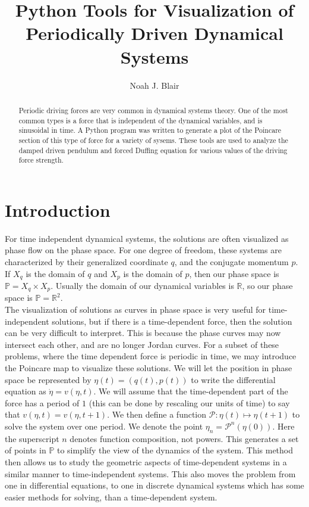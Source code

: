 \documentclass{paper}
\author{Noah J. Blair}
\title{Python Tools for Visualization of  Periodically Driven Dynamical Systems}
\newcommand{\bb}[1]{\mathbb{#1}}
\newcommand{\mc}[1]{\mathcal{#1}}
\begin{document}
\maketitle
\begin{abstract}
Periodic driving forces are very common in dynamical systems theory. One of the most common types is a force that is independent of the dynamical variables, and is sinusoidal in time. A Python program was written to generate a plot of the Poincare section of this type of force for a variety of sysems. These tools are used to analyze the damped driven pendulum and forced Duffing equation for various values of the driving force strength.
\end{abstract}
\section{Introduction}
For time independent dynamical systems, the solutions are often visualized as phase flow on the phase space. For one degree of freedom, these systems are characterized by their generalized coordinate $q$, and the conjugate momentum $p$. If $X_q$ is the domain of $q$ and $X_p$ is the domain of $p$, then our phase space is $\bb{P}=X_q\times X_p$. Usually the domain of our dynamical variables is $\bb{R}$, so our phase space is $\bb{P}=\bb{R}^2$.\\
The visualization of solutions as curves in phase space is very useful for time-independent solutions, but if there is a time-dependent force, then the solution can be very difficult to interpret. This is because the phase curves may now intersect each other, and are no longer Jordan curves. For a subset of these problems, where the time dependent force is periodic in time, we may introduce the Poincare map to visualize these solutions. We will let the position in phase space be represented by $\eta(t)=(q(t),p(t))$ to write the differential equation as $\dot{\eta}=v(\eta,t)$. We will assume that the time-dependent part of the force has a period of $1$ (this can be done by rescaling our units of time) to say that $v(\eta,t)=v(\eta,t+1)$. We then define a function $\mc{P}:\eta(t)\mapsto\eta(t+1)$ to solve the system over one period. We denote the point $\eta_n=\mc{P}^n(\eta(0))$. Here the superscript $n$ denotes function composition, not powers. This generates a set of points in $\bb{P}$ to simplify the view of the dynamics of the system. This method then allows us to study the geometric aspects of time-dependent systems in a similar manner to time-independent systems. This also moves the problem from one in differential equations, to one in discrete dynamical systems which has some easier methods for solving, than a time-dependent system.
\end{document}
